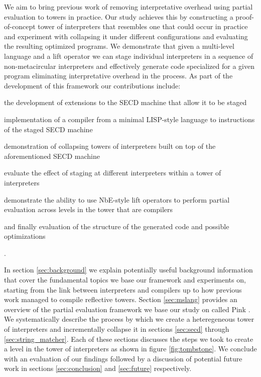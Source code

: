 \documentclass[a4paper,12pt,twoside,openright]{report}
\theoremstyle{definition}
\begin{document}
We aim to bring previous work of removing interpretative overhead using partial evaluation to towers in practice. Our study achieves this by constructing a proof-of-concept tower of interpreters that resembles one that could occur in practice and experiment with collapsing it under different configurations and evaluating the resulting optimized programs. We demonstrate that given a multi-level language and a lift operator we can stage individual interpreters in a sequence of non-metacircular interpreters and effectively generate code specialized for a given program eliminating interpretative overhead in the process. As part of the development of this framework our contributions include:
\begin{enumerate*}[label=(\arabic*)]
	\item the development of extensions to the SECD machine that allow it to be staged
	\item implementation of a compiler from a minimal LISP-style language to instructions of the staged SECD machine
	\item demonstration of collapsing towers of interpreters built on top of the aforementioned SECD machine
	\item evaluate the effect of staging at different interpreters within a tower of interpreters
	\item demonstrate the ability to use NbE-style lift operators to perform partial evaluation across levels in the tower that are compilers
	\item and finally evaluation of the structure of the generated code and possible optimizations
\end{enumerate*}.

In section \ref{sec:background} we explain potentially useful background information that cover the fundamental topics we base our framework and experiments on, starting from the link between interpreters and compilers up to how previous work managed to compile reflective towers. Section \ref{sec:mslang} provides an overview of the partial evaluation framework we base our study on called Pink \cite{amin2017collapsing}. We systematically describe the process by which we create a heteregeneous tower of interpreters and incrementally collapse it in sections \ref{sec:secd} through \ref{sec:string_matcher}. Each of these sections discusses the steps we took to create a level in the tower of interpreters as shown in figure \ref{fig:tombstone}. We conclude with an evaluation of our findings followed by a discussion of potential future work in sections \ref{sec:conclusion} and \ref{sec:future} respectively.
\end{document}
